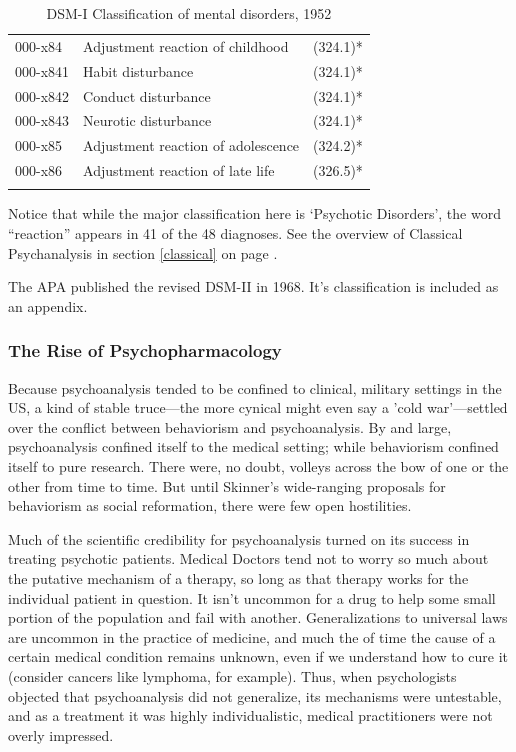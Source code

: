 \begin{longtable}[!t]{ | p{2cm} | p{8.8cm} | p{2cm} | }
     000-x84&     Adjustment reaction of childhood&(324.1)* \\
         000-x841&          Habit disturbance&(324.1)* \\
         000-x842&          Conduct disturbance&(324.1)* \\
         000-x843&          Neurotic disturbance&(324.1)* \\
     000-x85&     Adjustment reaction of adolescence&(324.2)* \\
     000-x86&     Adjustment reaction of late life&(326.5)* \\ \hline
\caption{DSM-I Classification of mental disorders, 1952}
\label{table: 1952Classification}
\end{longtable}


Notice that while the major classification here is `Psychotic Disorders', the word ``reaction'' appears in 41 of the 48 diagnoses. See the overview of Classical Psychanalysis in section \ref{classical} on page \pageref{classical}.

The APA published the revised DSM-II in 1968. It's classification is included as an appendix.

\subsubsection{The Rise of Psychopharmacology}
\label{theriseofpsychopharmacology}

Because psychoanalysis tended to be confined to clinical, military settings in the US, a kind of stable truce—the more cynical might even say a 'cold war’---settled over the conflict between behaviorism and psychoanalysis. By and large, psychoanalysis confined itself to the medical setting; while behaviorism confined itself to pure research. There were, no doubt, volleys across the bow of one or the other from time to time. But until Skinner's wide-ranging proposals for behaviorism as social reformation, there were few open hostilities.

Much of the scientific credibility for psychoanalysis turned on its success in treating psychotic patients. Medical Doctors tend not to worry so much about the putative mechanism of a therapy, so long as that therapy works for the individual patient in question. It isn't uncommon for a drug to help some small portion of the population and fail with another. Generalizations to universal laws are uncommon in the practice of medicine, and much the of time the cause of a certain medical condition remains unknown, even if we understand how to cure it (consider cancers like lymphoma, for example). Thus, when psychologists objected that psychoanalysis did not generalize, its mechanisms were untestable, and as a treatment it was highly individualistic, medical practitioners were not overly impressed. 

